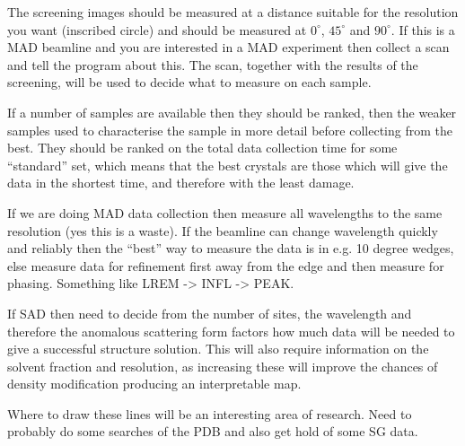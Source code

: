 \documentclass[a4paper, 11pt]{article}
\begin{document}
The screening images should be measured at a distance suitable for the 
resolution you want (inscribed circle) and should be measured at 
$0^{\circ}$, $45^{\circ}$ and $90^{\circ}$. If this is a MAD beamline and
you are interested in a MAD experiment then collect a scan and tell the 
program about this. The scan, together with the results of the screening,
will be used to decide what to measure on each sample.

If a number of samples are available then they should be ranked, then the
weaker samples used to characterise the sample in more detail before collecting
from the best. They should be ranked on the total data collection time for some
``standard'' set, which means that the best crystals are those which will 
give the data in the shortest time, and therefore with the least damage.

If we are doing MAD data collection then measure all wavelengths to the same
resolution (yes this is a waste). If the beamline can change wavelength 
quickly and reliably then the ``best'' way to measure the data is in e.g. 10
degree wedges, else measure data for refinement first away from the edge and
then measure for phasing. Something like LREM -> INFL -> PEAK. 

If SAD then need to decide from the number of sites, the wavelength and 
therefore the anomalous scattering form factors how much data will be needed
to give a successful structure solution. This will also require information
on the solvent fraction and resolution, as increasing these will improve the
chances of density modification producing an interpretable map.

Where to draw these lines will be an interesting area of research. Need to 
probably do some searches of the PDB and also get hold of some SG data.
\end{document}
